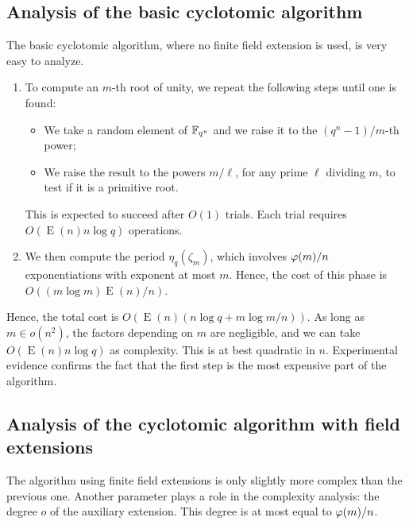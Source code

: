 \documentclass{article}
\DeclareMathOperator{\Ext}{E}
\begin{document}
\subsection{Analysis of the basic cyclotomic algorithm}

The basic cyclotomic algorithm, where no finite field extension is
used, is very easy to analyze.

\begin{enumerate}
\item To compute an $m$-th root of unity, we repeat the following
  steps until one is found:
  \begin{itemize}
  \item We take a random element of $\mathbb{F}_{q^n}$ and we raise it to the
    $(q^n-1)/m$-th power;
  \item We raise the result to the powers $m/\ell$, for any prime
    $\ell$ dividing $m$, to test if it is a primitive root.
  \end{itemize}
  This is expected to succeed after $O(1)$ trials. Each trial requires
  $O(\Ext(n)n\log q)$ operations.
\item We then compute the period $\eta_q(\zeta_m)$, which involves
  $\varphi(m)/n$ exponentiations with exponent at most $m$. Hence, the
  cost of this phase is $O((m\log m)\Ext(n)/n)$.
\end{enumerate}

Hence, the total cost is $O(\Ext(n)(n\log q + m\log m/n))$. As long as
$m\in o(n^2)$, the factors depending on $m$ are negligible, and we can
take $O(\Ext(n)n\log q)$ as complexity. This is at best quadratic in
$n$. Experimental evidence confirms the fact that the first step is
the most expensive part of the algorithm.


\subsection{Analysis of the cyclotomic algorithm with field
  extensions}

The algorithm using finite field extensions is only slightly more
complex than the previous one. Another parameter plays a role in the
complexity analysis: the degree $o$ of the auxiliary extension. This
degree is at most equal to $\varphi(m)/n$.
\end{document}
